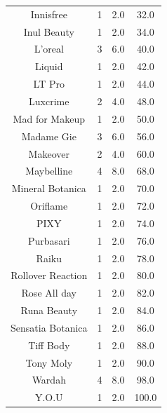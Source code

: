 \documentclass{article}
\begin{document}
\begin{longtable}{|c|c|c|c|}
    Innisfree         & 1                  & 2.0                 & 32.0                           \\
    Inul Beauty       & 1                  & 2.0                 & 34.0                           \\
    L'oreal           & 3                  & 6.0                 & 40.0                           \\
    Liquid            & 1                  & 2.0                 & 42.0                           \\
    LT Pro            & 1                  & 2.0                 & 44.0                           \\
    Luxcrime          & 2                  & 4.0                 & 48.0                           \\
    Mad for Makeup    & 1                  & 2.0                 & 50.0                           \\
    Madame Gie        & 3                  & 6.0                 & 56.0                           \\
    Makeover          & 2                  & 4.0                 & 60.0                           \\
    Maybelline        & 4                  & 8.0                 & 68.0                           \\
    Mineral Botanica  & 1                  & 2.0                 & 70.0                           \\
    Oriflame          & 1                  & 2.0                 & 72.0                           \\
    PIXY              & 1                  & 2.0                 & 74.0                           \\
    Purbasari         & 1                  & 2.0                 & 76.0                           \\
    Raiku             & 1                  & 2.0                 & 78.0                           \\
    Rollover Reaction & 1                  & 2.0                 & 80.0                           \\
    Rose All day      & 1                  & 2.0                 & 82.0                           \\
    Runa Beauty       & 1                  & 2.0                 & 84.0                           \\
    Sensatia Botanica & 1                  & 2.0                 & 86.0                           \\
    Tiff Body         & 1                  & 2.0                 & 88.0                           \\
    Tony Moly         & 1                  & 2.0                 & 90.0                           \\
    Wardah            & 4                  & 8.0                 & 98.0                           \\
    Y.O.U             & 1                  & 2.0                 & 100.0                          \\
\end{longtable}
\newpage
\end{document}
